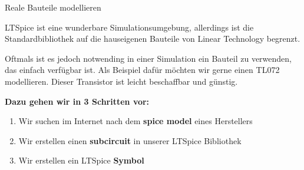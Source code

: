 \begin{frame}[t]{Reale Bauteile modellieren} 

    LTSpice ist eine wunderbare Simulationsumgebung, allerdings ist die Standardbibliothek
    auf die hauseigenen Bauteile von Linear Technology begrenzt.

    Oftmals ist es jedoch notwending in einer Simulation ein Bauteil zu verwenden, 
    das einfach verfügbar ist. Als Beispiel dafür möchten wir gerne einen TL072 modellieren.
    Dieser Transistor ist leicht beschaffbar und günstig.

    \textbf{Dazu gehen wir in 3 Schritten vor:}

    \begin{enumerate}
        \item Wir suchen im Internet nach dem \textbf{spice model} eines Herstellers
        \item Wir erstellen einen \textbf{subcircuit} in unserer LTSpice Bibliothek
        \item Wir erstellen ein LTSpice \textbf{Symbol} 
    \end{enumerate}
\end{frame}

